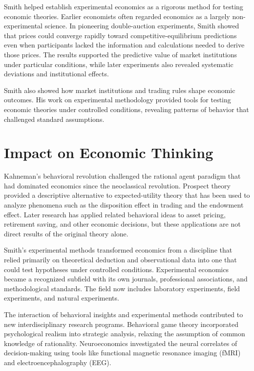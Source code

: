 Smith helped establish experimental economics as a rigorous method for testing
economic theories. Earlier economists often regarded economics as a largely
non-experimental science. In pioneering double-auction experiments, Smith showed
that prices could converge rapidly toward competitive-equilibrium predictions
even when participants lacked the information and calculations needed to derive
those prices. The results supported the predictive value of market institutions
under particular conditions, while later experiments also revealed systematic
deviations and institutional effects.

Smith also showed how market institutions and trading rules shape economic
outcomes. His work on experimental methodology provided tools for testing
economic theories under controlled
conditions, revealing patterns of behavior that challenged standard assumptions.

\section{Impact on Economic Thinking}
Kahneman's behavioral revolution challenged the rational agent paradigm that
had dominated economics since the neoclassical revolution. Prospect theory
provided a descriptive alternative to expected-utility theory that has been used
to analyze phenomena such as the disposition effect in trading and the endowment
effect. Later research has applied related behavioral ideas to asset pricing,
retirement saving, and other economic decisions, but these applications are not
direct results of the original theory alone.

Smith's experimental methods transformed economics from a discipline that
relied primarily on theoretical deduction and observational data into one
that could test hypotheses under controlled conditions. Experimental economics
became a recognized subfield with its own journals, professional associations,
and methodological standards. The field now includes laboratory experiments,
field experiments, and natural experiments.

The interaction of behavioral insights and experimental methods contributed to new
interdisciplinary research programs. Behavioral game theory incorporated
psychological realism into strategic analysis, relaxing the assumption of
common knowledge of rationality. Neuroeconomics investigated the neural
correlates of decision-making using tools like functional magnetic resonance
imaging (fMRI) and electroencephalography (EEG).

